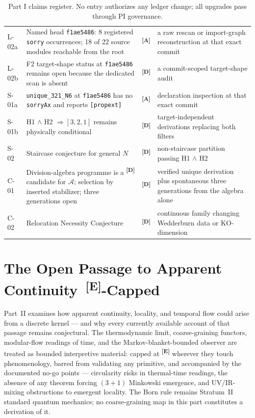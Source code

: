 \documentclass[12pt,a4paper,twoside]{article}
\theoremstyle{plain}
\theoremstyle{definition}
\theoremstyle{remark}
\newcommand{\catmark}[1]{\textsuperscript{\textsf{\textbf{[#1]}}}}
\begin{document}
\begin{table}[htbp]
\begin{tabular}{@{}lp{5.3cm}lp{4.3cm}@{}}
L-02a & Named head \texttt{f1ae5486}: 8 registered \texttt{sorry} occurrences; 18 of 22 source modules reachable from the root & \catmark{A} & a raw rescan or import-graph reconstruction at that exact commit \\
L-02b & F2 target-shape status at \texttt{f1ae5486} remains open because the dedicated scan is absent & \catmark{D} & a commit-scoped target-shape audit \\
S-01a & \texttt{unique\_321\_N6} at \texttt{f1ae5486} has no \texttt{sorryAx} and reports \texttt{[propext]} & \catmark{A} & declaration inspection at that exact commit \\
S-01b & H1 $\wedge$ H2 $\Rightarrow [3,2,1]$ remains physically conditional & \catmark{D} & target-independent derivations replacing both filters \\
S-02 & Staircase conjecture for general $N$ & \catmark{D} &
non-staircase partition passing H1 $\wedge$ H2 \\
C-01 & Division-algebra programme is a \catmark{D} candidate for
$\mathcal A$; selection by inserted stabilizer; three generations open
& \catmark{D} & verified unique derivation plus spontaneous three
generations from the algebra alone \\
C-02 & Relocation Necessity Conjecture & \catmark{D} & continuous
family changing Wedderburn data or KO-dimension \\
\bottomrule
\end{tabular}
\caption{Part I claims register. No entry authorizes any ledger change;
all upgrades pass through PI governance.}
\label{tab:part1-claims}
\end{table}



\newpage
\part{The Open Passage to Apparent Continuity\texorpdfstring{\ \catmark{E}}{[E]}-Capped}
\label{part:continuous-limit}

\noindent Part~II examines how apparent continuity, locality, and temporal
flow could arise from a discrete kernel --- and why every currently
available account of that passage remains conjectural. The thermodynamic
limit, coarse-graining functors, modular-flow readings of time, and the
Markov-blanket-bounded observer are treated as bounded interpretive
material: capped at \catmark{E} wherever they touch phenomenology, barred
from validating any primitive, and accompanied by the documented no-go
points --- circularity risks in thermal-time readings, the absence of any
theorem forcing $(3{+}1)$ Minkowski emergence, and UV/IR-mixing
obstructions to emergent locality. The Born rule remains Stratum~II
standard quantum mechanics; no coarse-graining map in this part
constitutes a derivation of it.
\end{document}

